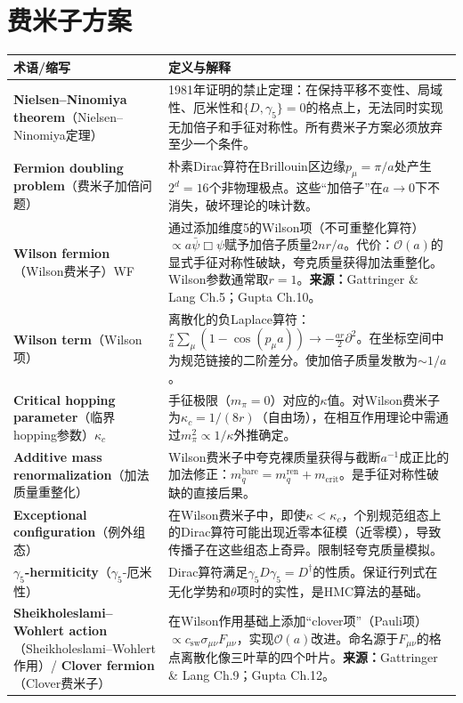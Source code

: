 \documentclass[12pt,a4paper]{ctexart}
\begin{document}
\section{费米子方案}

\begin{longtable}{p{3.5cm}p{9cm}}
\toprule
\textbf{术语/缩写} & \textbf{定义与解释} \\
\midrule
\endhead
\textbf{Nielsen--Ninomiya theorem}（Nielsen--Ninomiya定理）& 1981年证明的禁止定理：在保持平移不变性、局域性、厄米性和$\{D,\gamma_5\}=0$的格点上，无法同时实现无加倍子和手征对称性。所有费米子方案必须放弃至少一个条件。\\
\textbf{Fermion doubling problem}（费米子加倍问题）& 朴素Dirac算符在Brillouin区边缘$p_\mu = \pi/a$处产生$2^d = 16$个非物理极点。这些``加倍子''在$a\to 0$下不消失，破坏理论的味计数。\\
\textbf{Wilson fermion}（Wilson费米子）WF& 通过添加维度5的Wilson项（不可重整化算符）$\propto a\bar\psi\Box\psi$赋予加倍子质量$2n r/a$。代价：$\mathcal{O}(a)$的显式手征对称性破缺，夸克质量获得加法重整化。Wilson参数通常取$r=1$。\textbf{来源：}Gattringer \& Lang Ch.5；Gupta Ch.10。\\
\textbf{Wilson term}（Wilson项）& 离散化的负Laplace算符：$\frac{r}{a}\sum_\mu(1-\cos(p_\mu a)) \to -\frac{ar}{2}\partial^2$。在坐标空间中为规范链接的二阶差分。使加倍子质量发散为$\sim 1/a$。\\
\textbf{Critical hopping parameter}（临界hopping参数）$\kappa_c$& 手征极限（$m_\pi=0$）对应的$\kappa$值。对Wilson费米子为$\kappa_c = 1/(8r)$（自由场），在相互作用理论中需通过$m_\pi^2 \propto 1/\kappa$外推确定。\\
\textbf{Additive mass renormalization}（加法质量重整化）& Wilson费米子中夸克裸质量获得与截断$a^{-1}$成正比的加法修正：$m_q^{\text{bare}} = m_q^{\text{ren}} + m_{\text{crit}}$。是手征对称性破缺的直接后果。\\
\textbf{Exceptional configuration}（例外组态）& 在Wilson费米子中，即使$\kappa<\kappa_c$，个别规范组态上的Dirac算符可能出现近零本征模（近零模），导致传播子在这些组态上奇异。限制轻夸克质量模拟。\\
\textbf{$\gamma_5$-hermiticity}（$\gamma_5$-厄米性）& Dirac算符满足$\gamma_5 D \gamma_5 = D^\dagger$的性质。保证行列式在无化学势和$\theta$项时的实性，是HMC算法的基础。\\
\textbf{Sheikholeslami--Wohlert action}（Sheikholeslami--Wohlert作用）/ \textbf{Clover fermion}（Clover费米子）& 在Wilson作用基础上添加``clover项''（Pauli项）$\propto c_{\text{sw}}\sigma_{\mu\nu}F_{\mu\nu}$，实现$\mathcal{O}(a)$改进。命名源于$F_{\mu\nu}$的格点离散化像三叶草的四个叶片。\textbf{来源：}Gattringer \& Lang Ch.9；Gupta Ch.12。\\

\end{longtable}
\end{document}
